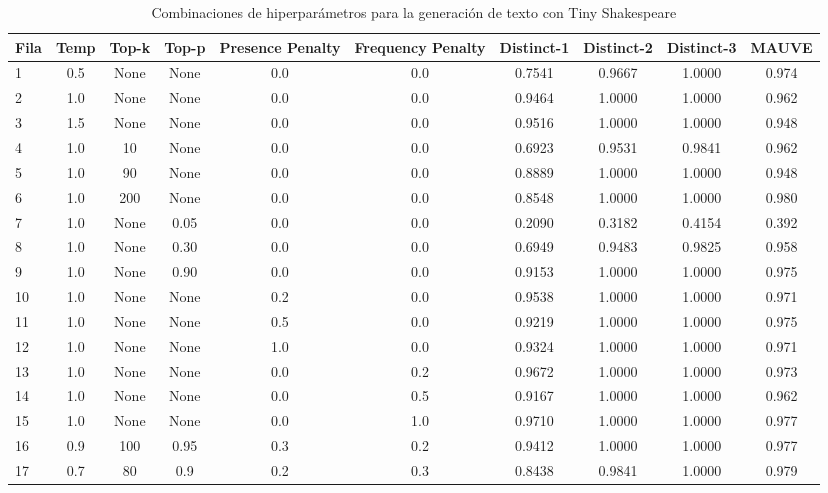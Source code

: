 \documentclass[11pt]{book}
\begin{document}
\begin{table}[h]
    \centering
    \caption{Combinaciones de hiperparámetros para la generación de texto con Tiny Shakespeare}
    \label{tab:res_mauve}
    \begin{tabular}{l c c c c c c c c c}
    \toprule
    \textbf{Fila} & \textbf{Temp} & \textbf{Top-k} & \textbf{Top-p} & \textbf{Presence Penalty} & \textbf{Frequency Penalty} & \textbf{Distinct-1} & \textbf{Distinct-2} & \textbf{Distinct-3} & \textbf{MAUVE}\\
    \midrule
    1 & 0.5 & None & None & 0.0 & 0.0 & 0.7541 & 0.9667 & 1.0000 & 0.974 \\
    2 & 1.0 & None & None & 0.0 & 0.0 & 0.9464 & 1.0000 & 1.0000 & 0.962\\
    3 & 1.5 & None & None & 0.0 & 0.0 & 0.9516 & 1.0000 & 1.0000 & 0.948\\
    4 & 1.0 & 10 & None & 0.0 & 0.0 & 0.6923 & 0.9531 & 0.9841 & 0.962 \\
    5 & 1.0 & 90 & None & 0.0 & 0.0 & 0.8889 & 1.0000 & 1.0000 & 0.948\\
    6 & 1.0 & 200 & None & 0.0 & 0.0 & 0.8548 & 1.0000 & 1.0000 & 0.980\\
    7 & 1.0 & None & 0.05 & 0.0 & 0.0 & 0.2090 & 0.3182 & 0.4154 & 0.392\\
    8 & 1.0 & None & 0.30 & 0.0 & 0.0 & 0.6949 & 0.9483 & 0.9825 & 0.958\\
    9 & 1.0 & None & 0.90 & 0.0 & 0.0 & 0.9153 & 1.0000 & 1.0000 & 0.975\\
    10 & 1.0 & None & None & 0.2 & 0.0 & 0.9538 & 1.0000 & 1.0000 & 0.971\\
    11 & 1.0 & None & None & 0.5 & 0.0 & 0.9219 & 1.0000 & 1.0000 & 0.975\\
    12 & 1.0 & None & None & 1.0 & 0.0 & 0.9324 & 1.0000 & 1.0000 & 0.971\\
    13 & 1.0 & None & None & 0.0 & 0.2 & 0.9672 & 1.0000 & 1.0000 & 0.973\\
    14 & 1.0 & None & None & 0.0 & 0.5 & 0.9167 & 1.0000 & 1.0000 & 0.962\\
    15 & 1.0 & None & None & 0.0 & 1.0 & 0.9710 & 1.0000 & 1.0000 & 0.977\\
    16 & 0.9 & 100 & 0.95 & 0.3 & 0.2 & 0.9412 & 1.0000 & 1.0000 & 0.977\\
    17 & 0.7 & 80 & 0.9 & 0.2 & 0.3 & 0.8438 & 0.9841 & 1.0000 & 0.979\\
    \bottomrule
    \end{tabular}
\end{table}
\end{document}

